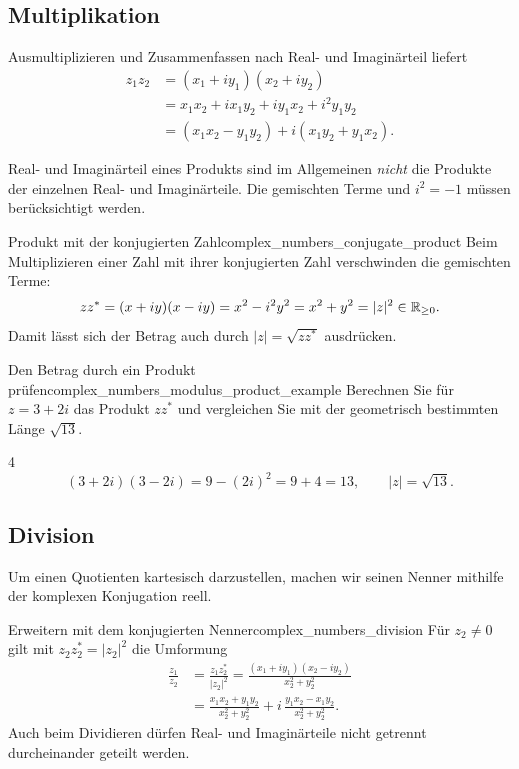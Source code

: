 \subsection{Multiplikation}
Ausmultiplizieren und Zusammenfassen nach Real- und Imaginärteil liefert
\[
  \begin{aligned}
    z_1z_2&=(x_1+iy_1)(x_2+iy_2)\\[5pt]
      &=x_1x_2+ix_1y_2+iy_1x_2+i^2y_1y_2\\[5pt]
      &=(x_1x_2-y_1y_2)+i(x_1y_2+y_1x_2).
  \end{aligned}
\]
\begin{RemarkBox}
  Real- und Imaginärteil eines Produkts sind im Allgemeinen \emph{nicht}
  die Produkte der einzelnen Real- und Imaginärteile. Die gemischten
  Terme und $i^2=-1$ müssen berücksichtigt werden.
\end{RemarkBox}
\begin{KeyPointBox}{Produkt mit der konjugierten Zahl}{complex_numbers_conjugate_product}
  Beim Multiplizieren einer Zahl mit ihrer konjugierten Zahl verschwinden
  die gemischten Terme:
  \[
    zz^*=(x+iy)(x-iy)=x^2-i^2y^2=x^2+y^2=|z|^2\in\mathbb{R}_{\ge0}.
  \]
  Damit lässt sich der Betrag auch durch $|z|=\sqrt{zz^*}$ ausdrücken.
\end{KeyPointBox}
\begin{ExampleBox}{Den Betrag durch ein Produkt prüfen}{complex_numbers_modulus_product_example}
  Berechnen Sie für $z=3+2i$ das Produkt $zz^*$ und vergleichen Sie
  mit der geometrisch bestimmten Länge $\sqrt{13}$.
  \begin{ClozeArea}{4}
    \[
      (3+2i)(3-2i)=9-(2i)^2=9+4=13,
      \qquad |z|=\sqrt{13}.
    \]
  \end{ClozeArea}
\end{ExampleBox}

\clearpage
\subsection{Division}
Um einen Quotienten kartesisch darzustellen, machen wir seinen Nenner
mithilfe der komplexen Konjugation reell.
\begin{KeyPointBox}{Erweitern mit dem konjugierten Nenner}{complex_numbers_division}
  Für $z_2\ne0$ gilt mit $z_2z_2^*=|z_2|^2$ die Umformung
  \[
    \begin{aligned}
      \frac{z_1}{z_2}
        &=\frac{z_1z_2^*}{|z_2|^2}
         =\frac{(x_1+iy_1)(x_2-iy_2)}{x_2^2+y_2^2}\\[7pt]
        &=\frac{x_1x_2+y_1y_2}{x_2^2+y_2^2}
          +i\,\frac{y_1x_2-x_1y_2}{x_2^2+y_2^2}.
    \end{aligned}
  \]
  Auch beim Dividieren dürfen Real- und Imaginärteile nicht getrennt
  durcheinander geteilt werden.
\end{KeyPointBox}

